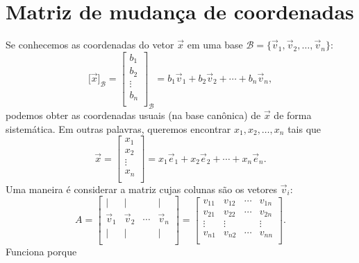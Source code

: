 \construirExer



\section{Matriz de mudança de coordenadas}

Se conhecemos as coordenadas do vetor $\vec{x}$ em uma base $\mathcal{B} = \big\{ \vec{v}_1, \vec{v}_2, \dots, \vec{v}_n \big\}$:
\begin{equation}
\big[ \vec{x} \big]_{\mathcal{B}} =
\left[
\begin{array}{c}
b_1 \\
b_2 \\
\vdots \\
b_n \\
\end{array}
\right]_{\mathcal{B}} = b_1 \vec{v}_1 + b_2 \vec{v}_2 + \cdots + b_n \vec{v}_n,
\end{equation} podemos obter as coordenadas usuais (na base canônica) de $\vec{x}$ de forma sistemática. Em outras palavras, queremos encontrar $x_1, x_2, \dots, x_n$ tais que
\begin{equation}
\vec{x} = \left[
\begin{array}{c}
x_1 \\
x_2 \\
\vdots \\
x_n \\
\end{array}
\right] = x_1 \vec{e}_1 + x_2 \vec{e}_2 + \cdots + x_n \vec{e}_n.
\end{equation} Uma maneira é considerar a matriz cujas colunas são os vetores $\vec{v}_i$:
\begin{equation}
A =
\left[
\begin{array}{cccc}
| & | &  & | \\
\vec{v}_{1} & \vec{v}_{2} & \cdots & \vec{v}_{n} \\
| & | &  & | \\
\end{array}
\right] =
\left[
\begin{array}{cccc}
v_{11} & v_{12} & \cdots & v_{1n} \\
v_{21} & v_{22} & \cdots & v_{2n} \\
\vdots & \vdots &        & \vdots \\
v_{n1} & v_{n2} & \cdots & v_{nn} \\
\end{array}
\right].
\end{equation} Funciona porque
